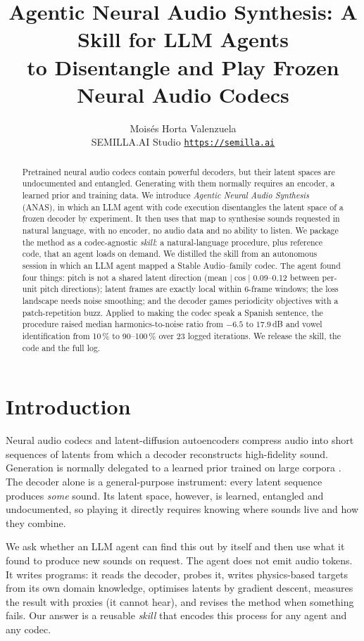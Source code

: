 \documentclass[10pt,twocolumn]{article}
\title{\vspace{-1.6em}\textbf{Agentic Neural Audio Synthesis: A Skill for LLM Agents\\to Disentangle and Play Frozen Neural Audio Codecs}\vspace{-0.6em}}
\author{Moisés Horta Valenzuela\\ \small SEMILLA.AI Studio \quad \href{https://semilla.ai}{\texttt{https://semilla.ai}}}
\date{\vspace{-1.8em}}
\begin{document}
\maketitle

\begin{abstract}
Pretrained neural audio codecs contain powerful decoders, but their latent spaces are undocumented and entangled. Generating with them normally requires an encoder, a learned prior and training data. We introduce \emph{Agentic Neural Audio Synthesis} (ANAS), in which an LLM agent with code execution disentangles the latent space of a frozen decoder by experiment. It then uses that map to synthesise sounds requested in natural language, with no encoder, no audio data and no ability to listen. We package the method as a codec-agnostic \emph{skill}: a natural-language procedure, plus reference code, that an agent loads on demand. We distilled the skill from an autonomous session in which an LLM agent mapped a Stable Audio--family codec. The agent found four things: pitch is not a shared latent direction (mean $|\cos|$ 0.09--0.12 between per-unit pitch directions); latent frames are exactly local within 6-frame windows; the loss landscape needs noise smoothing; and the decoder games periodicity objectives with a patch-repetition buzz. Applied to making the codec speak a Spanish sentence, the procedure raised median harmonics-to-noise ratio from $-6.5$ to $17.9$\,dB and vowel identification from 10\,\% to 90--100\,\% over 23 logged iterations. We release the skill, the code and the full log.
\end{abstract}

\section{Introduction}
Neural audio codecs \cite{zeghidour2021soundstream,defossez2022encodec,kumar2023dac} and latent-diffusion autoencoders \cite{evans2024fast} compress audio into short sequences of latents from which a decoder reconstructs high-fidelity sound. Generation is normally delegated to a learned prior trained on large corpora \cite{borsos2023audiolm,evans2024fast}. The decoder alone is a general-purpose instrument: every latent sequence produces \emph{some} sound. Its latent space, however, is learned, entangled and undocumented, so playing it directly requires knowing where sounds live and how they combine.

We ask whether an LLM agent can find this out by itself and then use what it found to produce new sounds on request. The agent does not emit audio tokens. It writes programs: it reads the decoder, probes it, writes physics-based targets from its own domain knowledge, optimises latents by gradient descent, measures the result with proxies (it cannot hear), and revises the method when something fails. Our answer is a reusable \emph{skill} that encodes this process for any agent and any codec.
\end{document}
